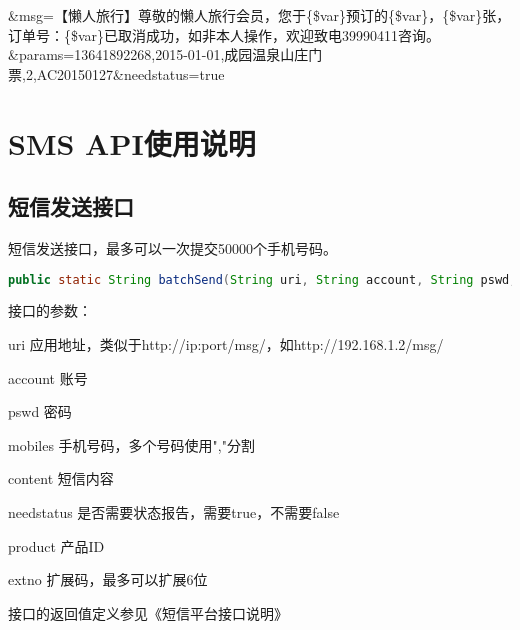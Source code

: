 \documentclass[11pt]{book} %
\begin{document}
\&msg=【懒人旅行】尊敬的懒人旅行会员，您于\{\$var\}预订的\{\$var\}，\{\$var\}张，订单号：\{\$var\}已取消成功，如非本人操作，欢迎致电39990411咨询。\&params=13641892268,2015-01-01,成园温泉山庄门票,2,AC20150127\&needstatus=true



\part{SMS API使用说明}


\chapter{短信发送接口}

短信发送接口，最多可以一次提交50000个手机号码。

\begin{lstlisting}[language=Java]
public static String batchSend(String uri, String account, String pswd, String mobiles, String content, boolean needstatus, String product, String extno) throws Exception
\end{lstlisting}

接口的参数：

\begin{compactitem}
\item uri 应用地址，类似于http://ip:port/msg/，如http://192.168.1.2/msg/
\item account 账号
\item pswd 密码
\item mobiles 手机号码，多个号码使用","分割
\item content 短信内容
\item needstatus 是否需要状态报告，需要true，不需要false
\item product 产品ID
\item extno 扩展码，最多可以扩展6位
\end{compactitem}

接口的返回值定义参见《短信平台接口说明》
\end{document}
